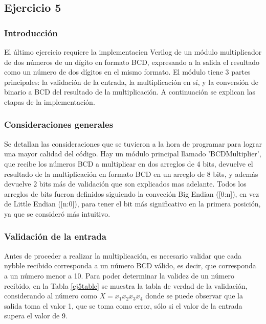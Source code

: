 \subsection{Ejercicio 5}

\subsubsection{Introducci\'on}
\noindent
El \'ultimo ejercicio requiere la implementaci en Verilog de un m\'odulo multiplicador de dos n\'umeros de un d\'igito en formato BCD, expresando a la salida el resultado como un n\'umero de dos d\'igitos en el mismo formato. \newline
El m\'odulo tiene 3 partes principales: la validaci\'on de la entrada, la multiplicaci\'on en s\'i, y la conversi\'on de binario a BCD del resultado de la multiplicaci\'on. A continuaci\'on se explican las etapas de la implementaci\'on.

\subsubsection{Consideraciones generales}
\noindent
Se detallan las consideraciones que se tuvieron a la hora de programar para lograr una mayor calidad del c\'odigo. 
Hay un m\'odulo principal llamado 'BCDMultiplier', que recibe los n\'umeros BCD a multiplicar en dos arreglos de 4 bits, devuelve el resultado de la multiplicaci\'on en formato BCD en un arreglo de 8 bits, y adem\'as devuelve 2 bits m\'as de validaci\'on que son explicados mas adelante.
Todos los arreglos de bits fueron definidos siguiendo la conveci\'on Big Endian ([0:n]), en vez de Little Endian ([n:0]), para tener el bit m\'as significativo en la primera posici\'on, ya que se consider\'o m\'as intuitivo. \newline



\subsubsection{Validaci\'on de la entrada}
\noindent

Antes de proceder a realizar la multiplicaci\'on, es necesario validar que cada nybble recibido corresponda a un n\'umero BCD v\'alido, es decir, que corresponda  a un n\'umero menor a 10. Para poder determinar la validez de un n\'umero recibido, en la Tabla \ref{ej5table} se muestra la tabla de verdad de la validaci\'on, considerando al n\'umero como $X = x_1x_2x_3x_4$ donde se puede observar que la salida toma el valor 1, que se toma como error, s\'olo si el valor de la entrada supera el valor de 9.

